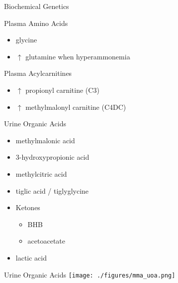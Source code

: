 \documentclass[presentation, smaller]{beamer}
\begin{document}
\begin{frame}[label={sec:orgheadline14}]{Biochemical Genetics}
\begin{block}{Plasma Amino Acids}
\begin{itemize}
\item \textpm{} glycine
\item \(\uparrow\) glutamine when hyperammonemia
\end{itemize}
\end{block}
\begin{block}{Plasma Acylcarnitines}
\begin{itemize}
\item \(\uparrow\) propionyl carnitine (C3)
\item \(\uparrow\) methylmalonyl carnitine (C4DC)
\end{itemize}
\end{block}

\begin{block}{Urine Organic Acids}
\begin{itemize}
\item methylmalonic acid
\item 3-hydroxypropionic acid
\item methylcitric acid
\item tiglic acid / tiglyglycine
\item Ketones
\begin{itemize}
\item BHB
\item acetoacetate
\end{itemize}
\item lactic acid
\end{itemize}
\end{block}
\end{frame}

\begin{frame}[label={sec:orgheadline15}]{Urine Organic Acids}
\texttt{[image: ./figures/mma\_uoa.png]}
\end{frame}
\end{document}
